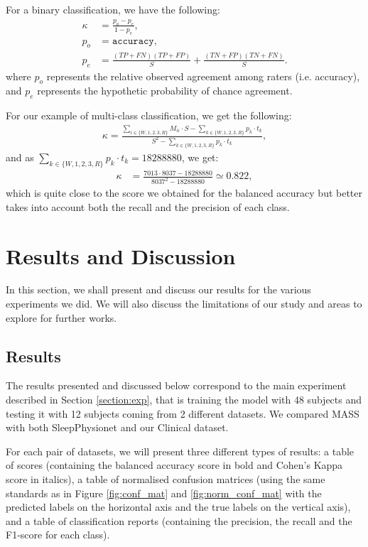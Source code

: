 \documentclass[titlepage, 11pt, a4paper, fancysections]{article}
\begin{document}
For a binary classification, we have the following:
\begin{align*}
    \kappa &= \frac{p_o-p_e}{1-p_e}, \\
    p_o &= \texttt{accuracy}, \\
    p_e &= \frac{(TP+FN)(TP+FP)}{S}+\frac{(TN+FP)(TN+FN)}{S}.
\end{align*}
where $p_o$ represents the relative observed agreement among raters (i.e. accuracy), and $p_e$ represents the hypothetic probability of chance agreement. 

For our example of multi-class classification, we get the following:
\begin{align*}
       \kappa = \frac{\sum_{i \in \{W, 1, 2, 3, R\}} M_{ii} \cdot S - \sum_{k \in \{W, 1, 2, 3, R\}} p_k \cdot t_k}{S^2 - \sum_{k \in \{W, 1, 2, 3, R\}} p_k \cdot t_k},
\end{align*}
and as $\sum_{k \in \{W, 1, 2, 3, R\}} p_k \cdot t_k = 18288880$, we get:
\begin{align*}
    \kappa &= \frac{7013\cdot8037-18288880}{8037^2-18288880} \simeq 0.822, 
\end{align*}
which is quite close to the score we obtained for the balanced accuracy but better takes into account both the recall and the precision of each class.

\newpage
\section{Results and Discussion}
In this section, we shall present and discuss our results for the various experiments we did. We will also discuss the limitations of our study and areas to explore for further works. 

\subsection{Results}
The results presented and discussed below correspond to the main experiment described in Section \ref{section:exp}, that is training the model with 48 subjects and testing it with 12 subjects coming from 2 different datasets. We compared MASS with both SleepPhysionet and our Clinical dataset. 

For each pair of datasets, we will present three different types of results: a table of scores (containing the balanced accuracy score in bold and Cohen's Kappa score in italics), a table of normalised confusion matrices (using the same standards as in Figure \ref{fig:conf_mat} and \ref{fig:norm_conf_mat} with the predicted labels on the horizontal axis and the true labels on the vertical axis), and a table of classification reports (containing the precision, the recall and the F1-score for each class).
\end{document}
